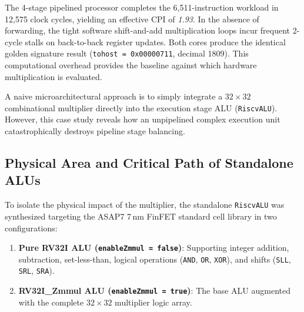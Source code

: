 \begin{table}[htbp]
\centering
\small
{}
\caption{Cycle-accurate performance metrics of single-cycle vs.\ 4-stage pipelined core on the pure \texttt{RV32I} DSP benchmark workload (no forwarding).}\label{tab:rv32i_benchmark_comparison}
\end{table}

The 4-stage pipelined processor completes the 6,511-instruction workload in 12,575 clock cycles, yielding an effective CPI of \textit{1.93}. In the absence of forwarding, the tight software shift-and-add multiplication loops incur frequent 2-cycle stalls on back-to-back register updates. Both cores produce the identical golden signature result (\texttt{tohost = 0x00000711}, decimal 1809). This computational overhead provides the baseline against which hardware multiplication is evaluated.

A naive microarchitectural approach is to simply integrate a $32 \times 32$ combinational multiplier directly into the execution stage ALU (\texttt{RiscvALU}). However, this case study reveals how an unpipelined complex execution unit catastrophically destroys pipeline stage balancing.

\subsection{Physical Area and Critical Path of Standalone ALUs}

To isolate the physical impact of the multiplier, the standalone \texttt{RiscvALU} was synthesized targeting the ASAP7 7\,nm FinFET standard cell library in two configurations:
\begin{enumerate}
    \item \textbf{Pure RV32I ALU (\texttt{enableZmmul = false})}: Supporting integer addition, subtraction, set-less-than, logical operations (\texttt{AND}, \texttt{OR}, \texttt{XOR}), and shifts (\texttt{SLL}, \texttt{SRL}, \texttt{SRA}).
    \item \textbf{RV32I\_Zmmul ALU (\texttt{enableZmmul = true})}: The base ALU augmented with the complete $32 \times 32$ multiplier logic array.
\end{enumerate}

